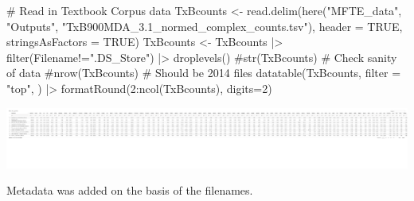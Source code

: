 \documentclass[
  letterpaper,
  DIV=11,
  numbers=noendperiod]{scrreprt}
\newenvironment{Shaded}{\begin{snugshade}}{\end{snugshade}}
\newcommand{\AttributeTok}[1]{\textcolor[rgb]{0.40,0.45,0.13}{#1}}
\newcommand{\CommentTok}[1]{\textcolor[rgb]{0.37,0.37,0.37}{#1}}
\newcommand{\ConstantTok}[1]{\textcolor[rgb]{0.56,0.35,0.01}{#1}}
\newcommand{\DecValTok}[1]{\textcolor[rgb]{0.68,0.00,0.00}{#1}}
\newcommand{\FunctionTok}[1]{\textcolor[rgb]{0.28,0.35,0.67}{#1}}
\newcommand{\NormalTok}[1]{\textcolor[rgb]{0.00,0.23,0.31}{#1}}
\newcommand{\OtherTok}[1]{\textcolor[rgb]{0.00,0.23,0.31}{#1}}
\newcommand{\SpecialCharTok}[1]{\textcolor[rgb]{0.37,0.37,0.37}{#1}}
\newcommand{\StringTok}[1]{\textcolor[rgb]{0.13,0.47,0.30}{#1}}
\begin{document}
\begin{Shaded}
\begin{Highlighting}[]
\CommentTok{\# Read in Textbook Corpus data}
\NormalTok{TxBcounts }\OtherTok{\textless{}{-}} \FunctionTok{read.delim}\NormalTok{(}\FunctionTok{here}\NormalTok{(}\StringTok{"MFTE\_data"}\NormalTok{, }\StringTok{"Outputs"}\NormalTok{, }\StringTok{"TxB900MDA\_3.1\_normed\_complex\_counts.tsv"}\NormalTok{), }\AttributeTok{header =} \ConstantTok{TRUE}\NormalTok{, }\AttributeTok{stringsAsFactors =} \ConstantTok{TRUE}\NormalTok{)}
\NormalTok{TxBcounts }\OtherTok{\textless{}{-}}\NormalTok{ TxBcounts }\SpecialCharTok{|\textgreater{}} 
  \FunctionTok{filter}\NormalTok{(Filename}\SpecialCharTok{!=}\StringTok{".DS\_Store"}\NormalTok{) }\SpecialCharTok{|\textgreater{}}  
  \FunctionTok{droplevels}\NormalTok{()}
\CommentTok{\#str(TxBcounts) \# Check sanity of data}
\CommentTok{\#nrow(TxBcounts) \# Should be 2014 files}
\FunctionTok{datatable}\NormalTok{(TxBcounts,}
  \AttributeTok{filter =} \StringTok{"top"}\NormalTok{,}
\NormalTok{) }\SpecialCharTok{|\textgreater{}} 
  \FunctionTok{formatRound}\NormalTok{(}\DecValTok{2}\SpecialCharTok{:}\FunctionTok{ncol}\NormalTok{(TxBcounts), }\AttributeTok{digits=}\DecValTok{2}\NormalTok{)}
\end{Highlighting}
\end{Shaded}

\includegraphics{Ch6_data_prep_files/figure-pdf/raw_data-1.pdf}

Metadata was added on the basis of the filenames.

\begin{Shaded}
\end{Shaded}
\end{document}
